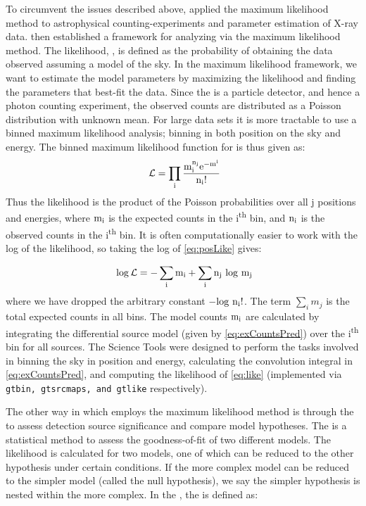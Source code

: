 To circumvent the issues described above, \cite{Cash79} applied the maximum likelihood method to astrophysical counting-experiments and parameter estimation of X-ray data. \cite{mattox96} then established a framework for analyzing \egret{} \gam{} via the maximum likelihood method. The likelihood, \like{}, is defined as the probability of obtaining the data observed assuming a model of the sky. In the maximum likelihood framework, we want to estimate the model parameters by maximizing the likelihood and finding the  parameters that best-fit the data. Since the \lat{} is a particle detector, and hence a photon counting experiment, the observed counts are distributed as a Poisson distribution with unknown mean. For large data sets it is more tractable to use a binned maximum likelihood analysis; binning in both position on the sky and energy. The binned maximum likelihood function for \lat{} is thus given as:
\begin{equation}\label{eq:posLike}
{\rm \like{} = \prod_{i} \frac{m_i^{n_j}e^{-m^i}}{n_i!}}
\end{equation}
Thus the likelihood is the product of the Poisson probabilities over all j positions and energies, where ${\rm m_i}$ is the expected counts in the i\textsuperscript{th} bin, and ${\rm n_i}$ is the observed counts in the i\textsuperscript{th} bin.  It is often computationally easier to work with the log of the likelihood, so taking the log of \ref{eq:posLike} gives:

\begin{equation}\label{eq:like}
{\rm \logL{} = -\sum_{i} m_i + \sum_{i} n_j~log~m_j}
\end{equation}
where we have dropped the arbitrary constant  ${\rm -log~n_i!}$. The term $\sum_{i} m_j $ is the total expected counts in all bins. The model counts ${\rm m_i}$ are calculated by integrating the differential source model (given by \ref{eq:exCountsPred}) over the i\textsuperscript{th} bin for all sources. The \Fermi{} Science Tools were designed to perform the tasks involved in binning the sky in position and energy, calculating the convolution integral in \ref{eq:exCountsPred}, and computing the likelihood of \ref{eq:like} (implemented via {\tt gtbin, gtsrcmaps, and gtlike} respectively).

The other way in which \Fermi{} employs the maximum likelihood method is through the \lrt{} to assess detection source significance and compare model hypotheses. The \lrt{} is a statistical method to assess the goodness-of-fit of two different models. The likelihood is calculated for two models, one of which can be reduced to the other hypothesis under certain conditions. If the more complex model can be reduced to the simpler model (called the null hypothesis), we say the simpler hypothesis is nested within the more complex. In the \lrt{}, the \ts{} is defined as: 

